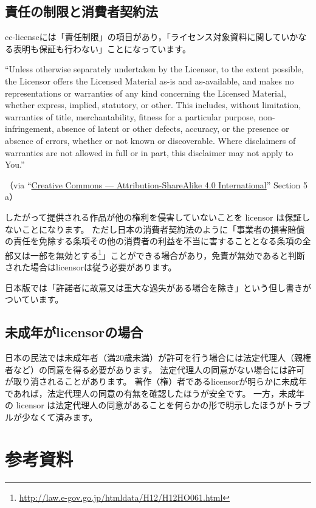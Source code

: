 \documentclass{ltjsarticle}
\begin{document}
\subsection{責任の制限と消費者契約法}

cc-licenseには「責任制限」の項目があり，「ライセンス対象資料に関していかなる表明も保証も行わない」ことになっています。
\begin{mdframed}
``Unless otherwise separately undertaken by the Licensor, to the extent possible, the Licensor offers the Licensed Material as-is and as-available, and makes no representations or warranties of any kind concerning the Licensed Material, whether express, implied, statutory, or other. This includes, without limitation, warranties of title, merchantability, fitness for a particular purpose, non-infringement, absence of latent or other defects, accuracy, or the presence or absence of errors, whether or not known or discoverable. Where disclaimers of warranties are not allowed in full or in part, this disclaimer may not apply to You.'' \par
（via ``\href{http://creativecommons.org/licenses/by-sa/4.0/legalcode}{Creative Commons — Attribution-ShareAlike 4.0 International}'' Section 5 a）
\end{mdframed}
したがって提供される作品が他の権利を侵害していないことを licensor は保証しないことになります。
ただし日本の消費者契約法のように「事業者の損害賠償の責任を免除する条項その他の消費者の利益を不当に害することとなる条項の全部又は一部を無効とする\footnote{\url{http://law.e-gov.go.jp/htmldata/H12/H12HO061.html}}」ことができる場合があり，免責が無効であると判断された場合はlicensorは従う必要があります。

日本版では「許諾者に故意又は重大な過失がある場合を除き」という但し書きがついています。


\subsection{未成年がlicensorの場合}

日本の民法では未成年者（満20歳未満）が許可を行う場合には法定代理人（親権者など）の同意を得る必要があります。
法定代理人の同意がない場合には許可が取り消されることがあります。
著作（権）者であるlicensorが明らかに未成年であれば，法定代理人の同意の有無を確認したほうが安全です。
一方，未成年の licensor は法定代理人の同意があることを何らかの形で明示したほうがトラブルが少なくて済みます。


\clearpage
\section*{参考資料}
\end{document}
